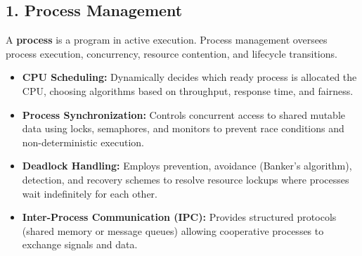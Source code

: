 \documentclass[11pt,a4paper]{article}
\begin{document}
\begin{center}
\end{center}

\subsection{1. Process Management}

A \textbf{process} is a program in active execution. Process management oversees process execution, concurrency, resource contention, and lifecycle transitions.

\begin{itemize}
    \item \textbf{CPU Scheduling:} Dynamically decides which ready process is allocated the CPU, choosing algorithms based on throughput, response time, and fairness.
    \item \textbf{Process Synchronization:} Controls concurrent access to shared mutable data using locks, semaphores, and monitors to prevent race conditions and non-deterministic execution.
    \item \textbf{Deadlock Handling:} Employs prevention, avoidance (Banker's algorithm), detection, and recovery schemes to resolve resource lockups where processes wait indefinitely for each other.
    \item \textbf{Inter-Process Communication (IPC):} Provides structured protocols (shared memory or message queues) allowing cooperative processes to exchange signals and data.
\end{itemize}
\end{document}
